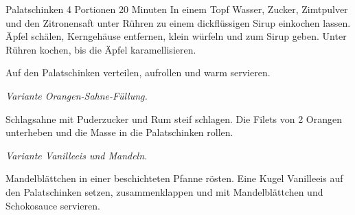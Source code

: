 \begin{recipe}{Palatschinken} {4 Portionen} {20 Minuten}
  In einem Topf Wasser, Zucker, Zimtpulver und den Zitronensaft unter Rühren zu einem dickflüssigen Sirup einkochen lassen.
  Äpfel schälen, Kerngehäuse entfernen, klein würfeln und zum Sirup geben.
  Unter Rühren kochen, bis die Äpfel karamellisieren.

  \newstep
  Auf den Palatschinken verteilen, aufrollen und warm servieren.

  \freeform
  \hrulefill

  \freeform
  \textit{Variante Orangen-Sahne-Füllung.}


  Schlagsahne mit Puderzucker und Rum steif schlagen.
  Die Filets von 2 Orangen unterheben und die Masse in die Palatschinken rollen.

  \freeform
  \hrulefill

  \freeform
  \textit{Variante Vanilleeis und Mandeln.}


  Mandelblättchen in einer beschichteten Pfanne rösten.
  Eine Kugel Vanilleeis auf den Palatschinken setzen, zusammenklappen und mit Mandelblättchen und Schokosauce servieren.

  \freeform
  \hrulefill

  \end{recipe}
